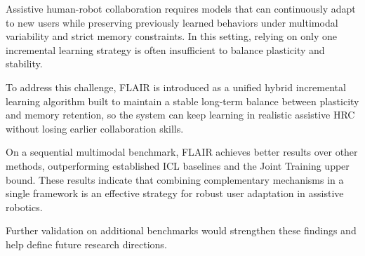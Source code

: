 \documentclass[3p,times,procedia]{elsarticle}
\begin{document}
Assistive human-robot collaboration requires models that can continuously adapt to new users while preserving previously learned behaviors under multimodal variability and strict memory constraints. In this setting, relying on only one incremental learning strategy is often insufficient to balance plasticity and stability.

To address this challenge, FLAIR is introduced as a unified hybrid incremental learning algorithm built to maintain a stable long-term balance between plasticity and memory retention, so the system can keep learning in realistic assistive HRC without losing earlier collaboration skills.

On a sequential multimodal benchmark, FLAIR achieves better results over other methods, outperforming established ICL baselines and the Joint Training upper bound. These results indicate that combining complementary mechanisms in a single framework is an effective strategy for robust user adaptation in assistive robotics. 

Further validation on additional benchmarks would strengthen these findings and help define future research directions.

\newpage


\end{document}
